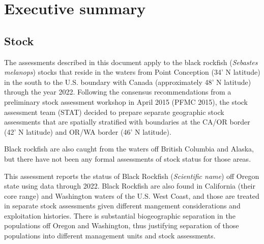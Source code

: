 \documentclass[11pt,
  english,
  letterpaper,
]{article}
\begin{document}
\newcommand{\lt}{\ensuremath <}
\newcommand{\gt}{\ensuremath >}

\vspace{500cm}

\pagebreak
{}
\setcounter{page}{1}

\renewcommand{\thetable}{\roman{table}}
\renewcommand{\thefigure}{\roman{figure}}

\setlength\parskip{0.5em plus 0.1em minus 0.2em}

\hypertarget{executive-summary}{%
\section*{Executive summary}\label{executive-summary}}

\hypertarget{stock}{%
\subsection*{Stock}\label{stock}}

The assessments described in this document apply to the black rockfish (\emph{Sebastes melanops}) stocks that reside in the waters from Point Conception (34' N latitude) in the south to the U.S. boundary with Canada (approximately 48' N latitude) through the year 2022. Following the consensus recommendations from a preliminary stock assessment workshop in April 2015 (PFMC 2015), the stock assessment team (STAT) decided to prepare separate geographic stock assessments that are spatially stratified with boundaries at the CA/OR border (42' N latitude) and OR/WA border (46' N latitude).

Black rockfish are also caught from the waters off British Columbia and Alaska, but there have not been any formal assessments of stock status for those areas.

This assessment reports the status of Black Rockfish (\emph{Scientific name}) off Oregon state using data through 2022. Black Rockfish are also found in California (their core range) and Washington waters of the U.S. West Coast, and those are treated in separate stock assessments given different mangement considerations and exploitation histories. There is substantial biogeographic separation in the populations off Oregon and Washington, thus justifying separation of those populations into different management units and stock assessments.
\end{document}
